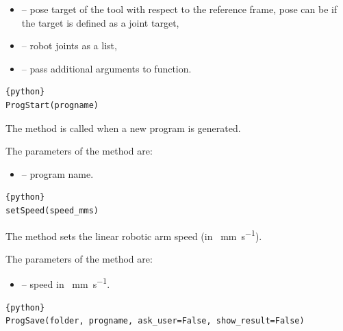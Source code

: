 \begin{itemize}

\item {} -- pose target of the tool with respect to the reference frame, pose can be  if the target is defined as a joint target,

\item {} -- robot joints as a list,

\item {} -- pass additional arguments to function. 

\end{itemize}



\begin{lstlisting}[frame=lines,numbers=none,breaklines=true]{python}
ProgStart(progname)
\end{lstlisting}

The  method is called when a new program is generated.


The parameters of the  method are:

\begin{itemize}

\item {} -- program name.

\end{itemize}

\begin{lstlisting}[frame=lines,numbers=none,breaklines=true]{python}
setSpeed(speed_mms)
\end{lstlisting}

The  method sets the linear robotic arm speed (in \SI{}{\mm\per\second}).


The parameters of the   method are:

\begin{itemize}

\item {} -- speed in \SI{}{\mm\per\second}.

\end{itemize}

\begin{lstlisting}[frame=lines,numbers=none,breaklines=true]{python}
ProgSave(folder, progname, ask_user=False, show_result=False)
\end{lstlisting}

